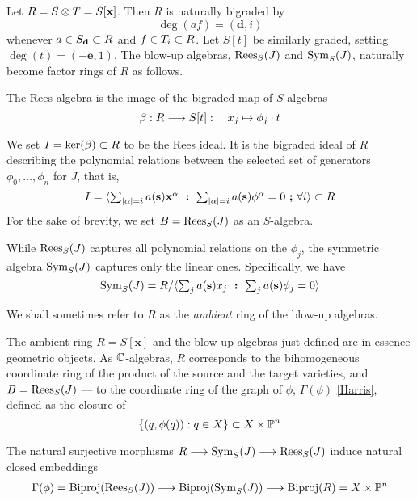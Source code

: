 \documentclass[fleqn,reqno]{amsart}
\numberwithin{first}{chapter}
\begin{document}
\begin{paragraf}
\label{par:blowup-algebras}
Let $R=S\otimes T=S[\mathbf x]$. Then $R$ is naturally bigraded by
\[
	\deg(af)=(\mathbf d,i)
\]
whenever $a\in S_{\mathbf d}\subset R$ and $f\in T_i\subset R$.
Let $S[t]$ be similarly graded, setting $\deg(t)=(-\mathbf e,1)$.
The blow-up algebras, $\operatorname{Rees}_S(J)$ and $\operatorname{Sym}_S(J)$, naturally become
factor rings of $R$ as follows.

The Rees algebra is the image of the bigraded map of $S$-algebras
\[
	\beta:R\longrightarrow S[t]:\quad x_j\mapsto\phi_j\cdot t
\]

We set $I=\ker(\beta)\subset R$ to be the  Rees ideal.
It is the bigraded ideal of $R$ describing the polynomial relations between the
selected set of generators $\phi_0,\ldots,\phi_n$ for $J$,
that is,
\[
	I=\langle \textstyle\sum_{|\alpha|=i} a(\mathbf s){\mathbf x}^{\alpha}
	~\boldsymbol:~
	\textstyle\sum_{|\alpha|=i} a(\mathbf s){\mathbf \phi}^{\alpha}=0
	~\boldsymbol;~\forall i\rangle\subset R
\]
For the sake of brevity, we set $B=\operatorname{Rees}_S(J)$ as an $S$-algebra.

While $\operatorname{Rees}_S(J)$ captures all polynomial relations on the $\phi_j$,
the symmetric algebra $\operatorname{Sym}_S(J)$ captures only the linear ones.
Specifically, we have
\[
	\operatorname{Sym}_S(J)=R/\langle \textstyle\sum_j a(\mathbf s)x_j
	~\boldsymbol:~
	\textstyle\sum_j a(\mathbf s)\phi_j=0
	\rangle
\]

We shall sometimes refer to $R$ as the {\em ambient} ring of the blow-up algebras.
\end{paragraf}

\begin{paragraf}
\label{par:the-graph}
The ambient ring $R=S[\mathbf x]$ and the blow-up algebras just defined are in essence geometric objects.
As $\mathbb{C}$-algebras, $R$ corresponds to the bihomogeneous coordinate ring of the product of
the source and the target varieties,
and $B=\operatorname{Rees}_S(J)$ --- to the coordinate ring of the graph of $\phi$, $\Gamma(\phi)$ \ref{Harris},
defined as the closure of
\[
	\{(q,\phi(q)):q\in X\}\subset X\times \mathbb{P}^n
\]

The natural surjective morphisms $R\longrightarrow \operatorname{Sym}_S(J)\longrightarrow \operatorname{Rees}_S(J)$ induce natural closed embeddings
\begin{align}
\label{eq:R-Sym-B}
\Gamma(\phi)=\operatorname{Biproj}(\operatorname{Rees}_S(J))\longrightarrow \operatorname{Biproj}(\operatorname{Sym}_S(J))\longrightarrow \operatorname{Biproj}(R)=X\times \mathbb{P}^n
\end{align}
\end{paragraf}
\end{document}
